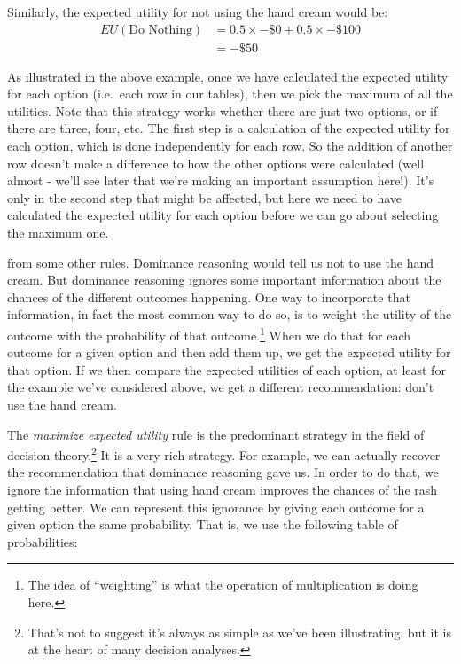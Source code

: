 \documentclass[]{tufte-book}
\begin{document}
Similarly, the expected utility for not using the hand cream would be:
\[
  \begin{aligned}
  EU(\text{Do Nothing}) &= 0.5\times -\$0 + 0.5\times -\$100 \\
  &= -\$50
  \end{aligned}
\]

As illustrated in the above example, once we have calculated the expected utility for each option (i.e.~each row in our tables), then we pick the maximum of all the utilities. Note that this strategy works whether there are just two options, or if there are three, four, etc. The first step is a calculation of the expected utility for each option, which is done independently for each row. So the addition of another row doesn't make a difference to how the other options were calculated (well almost - we'll see later that we're making an important assumption here!). It's only in the second step that might be affected, but here we need to have calculated the expected utility for each option before we can go about selecting the maximum one.

 from some other rules. Dominance reasoning would tell us not to use the hand cream. But dominance reasoning ignores some important information about the chances of the different outcomes happening. One way to incorporate that information, in fact the most common way to do so, is to weight the utility of the outcome with the probability of that outcome.\footnote{The idea of ``weighting'' is what the operation of multiplication is doing here.} When we do that for each outcome for a given option and then add them up, we get the expected utility for that option. If we then compare the expected utilities of each option, at least for the example we've considered above, we get a different recommendation: don't use the hand cream.

The \emph{maximize expected utility} rule is the predominant strategy in the field of decision theory.\footnote{That's not to suggest it's always as simple as we've been illustrating, but it is at the heart of many decision analyses.} It is a very rich strategy. For example, we can actually recover the recommendation that dominance reasoning gave us. In order to do that, we ignore the information that using hand cream improves the chances of the rash getting better. We can represent this ignorance by giving each outcome for a given option the same probability. That is, we use the following table of probabilities:
\end{document}
